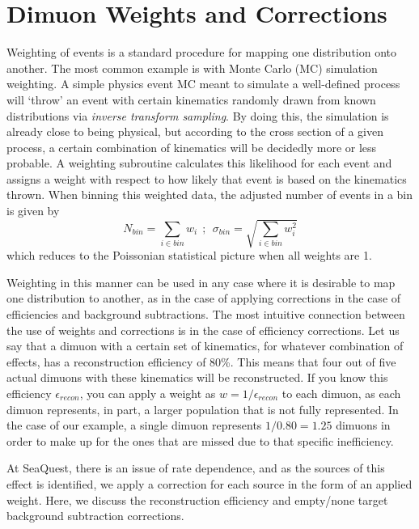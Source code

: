 \section{Dimuon Weights and Corrections}

Weighting of events is a standard procedure for mapping one distribution onto another. The most common example is with Monte Carlo (MC) simulation weighting. A simple physics event MC meant to simulate a well-defined process will `throw' an event with certain kinematics randomly drawn from known distributions via \emph{inverse transform sampling}. By doing this, the simulation is already close to being physical, but according to the cross section of a given process, a certain combination of kinematics will be decidedly more or less probable. A weighting subroutine calculates this likelihood for each event and assigns a weight with respect to how likely that event is based on the kinematics thrown. When binning this weighted data, the adjusted number of events in a bin is given by
\begin{equation}
	N_{bin} = \sum_{i \in bin} w_i\ \ ;\ \ \sigma_{bin} = \sqrt{\sum_{i\in bin} w_i^2}
	\label{eq:gmc-weight}
\end{equation}
which reduces to the Poissonian statistical picture when all weights are 1.

Weighting in this manner can be used in any case where it is desirable to map one distribution to another, as in the case of applying corrections in the case of efficiencies and background subtractions. The most intuitive connection between the use of weights and corrections is in the case of efficiency corrections. Let us say that a dimuon with a certain set of kinematics, for whatever combination of effects, has a reconstruction efficiency of 80\%. This means that four out of five actual dimuons with these kinematics will be reconstructed. If you know this efficiency $\epsilon_{recon}$, you can apply a weight as $w = 1/\epsilon_{recon}$ to each dimuon, as each dimuon represents, in part, a larger population that is not fully represented. In the case of our example, a single dimuon represents $1/0.80 = 1.25$ dimuons in order to make up for the ones that are missed due to that specific inefficiency.

At SeaQuest, there is an issue of rate dependence, and as the sources of this effect is identified, we apply a correction for each source in the form of an applied weight. Here, we discuss the reconstruction efficiency and empty/none target background subtraction corrections.

